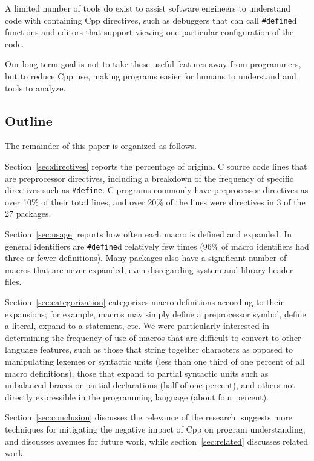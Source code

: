 \documentclass[11pt]{article}
\def\numpackages{27}
\begin{document}

A limited number of tools do exist to assist software engineers to
understand code with containing Cpp directives, such as debuggers that can
call {\tt \#define}d functions and editors that support viewing one
particular configuration of the code.

Our long-term goal is not to take these useful features away from
programmers, but to reduce Cpp use, making programs easier for humans to
understand and tools to analyze.


\subsection{Outline}

The remainder of this paper is organized as follows.

Section~\ref{sec:directives} reports the percentage of original C source
code lines that are preprocessor directives, including a breakdown of the
frequency of specific directives such as {\tt \#define}.  C programs
commonly have preprocessor directives as over 10\% of their total lines,
and over 20\% of the lines were directives in 3 of the {\numpackages}
packages.

Section~\ref{sec:usage} reports how often each macro is defined and
expanded.  In general identifiers are {\tt \#define}d relatively few times
(96\% of macro identifiers had three or fewer definitions).  Many packages
also have a significant number of macros that are never expanded, even
disregarding system and library header files.

Section~\ref{sec:categorization} categorizes macro definitions according to
their expansions; for example, macros may simply define a preprocessor
symbol, define a literal, expand to a statement, etc.  We were particularly
interested in determining the frequency of use of macros that are difficult
to convert to other language features, such as those that string together
characters as opposed to manipulating lexemes or syntactic units (less than
one third of one percent of all macro definitions),
those that expand to partial syntactic units such as unbalanced
braces or partial declarations (half of one percent), and others not 
directly expressible in the programming language (about four percent).

Section~\ref{sec:conclusion} discusses the relevance of the research,
suggests more techniques for mitigating the negative impact of Cpp on
program understanding, and discusses avenues for future work, while
section~\ref{sec:related} discusses related work.
\end{document}
